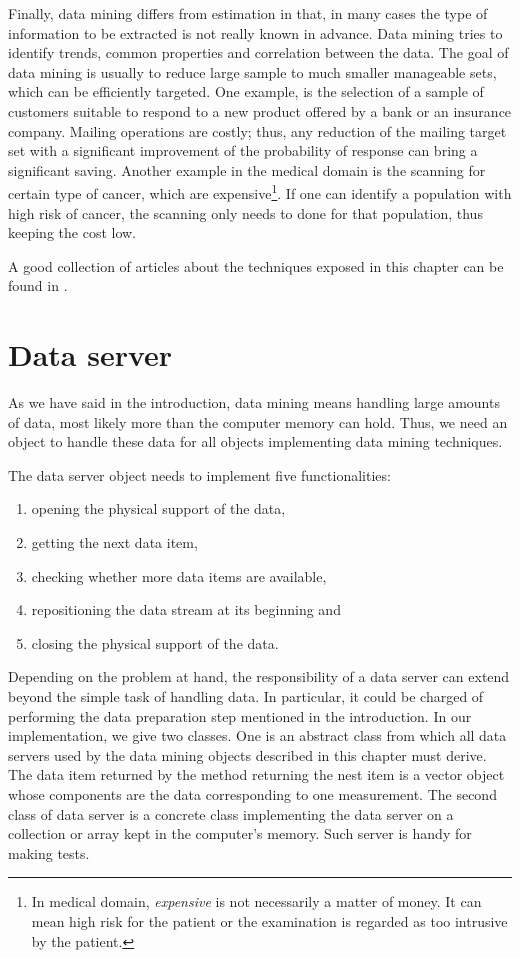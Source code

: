 Finally, data mining differs from estimation in that, in many
cases the type of information to be extracted is not really known
in advance. Data mining tries to identify trends, common
properties and correlation between the data. The goal of data
mining is usually to reduce large sample to much smaller
manageable sets, which can be efficiently targeted. One example,
is the selection of a sample of customers suitable to respond to a
new product offered by a bank or an insurance company. Mailing
operations are costly; thus, any reduction of the mailing target
set with a significant improvement of the probability of response
can bring a significant saving. Another example in the medical
domain is the scanning for certain type of cancer, which are
expensive\footnote{In medical domain, \textsl{expensive} is not
necessarily a matter of money. It can mean high risk for the
patient or the examination is regarded as too intrusive by the
patient.}. If one can identify a population with high risk of
cancer, the scanning only needs to done for that population, thus
keeping the cost low.

A good collection of articles about the techniques exposed in this chapter can be found in \cite{AtchBry}.

\section{Data server}
\label{sec:dataserver}  As we
have said in the introduction, data mining means handling large
amounts of data, most likely more than the computer memory can
hold. Thus, we need an object to handle these data for all objects
implementing data mining techniques.

\noindent The data server object needs to implement five functionalities:
\begin{enumerate}
  \item opening the physical support of the data,
  \item getting the next data item,
  \item checking whether more data items are available,
  \item repositioning the data stream at its beginning and
  \item closing the physical support of the data.
\end{enumerate}
Depending on the problem at hand, the responsibility of a data
server can extend beyond the simple task of handling data. In
particular, it could be charged of performing the data preparation
step mentioned in the introduction. In our implementation, we give
two classes. One is an abstract class from which all data servers
used by the data mining objects described in this chapter must
derive. The data item returned by the method returning the nest
item is a vector object whose components are the data
corresponding to one measurement. The second class of data server
is a concrete class implementing the data server on a collection
or array kept in the computer's memory. Such server is handy for
making tests.

